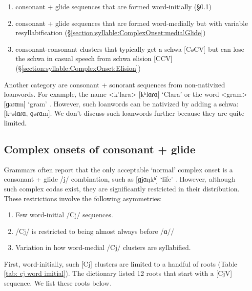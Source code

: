 	\begin{enumerate}[noitemsep,topsep=0pt]
		\item consonant + glide sequences that are formed word-initially  (\S\ref{section:syllable:ComplexOnset:glide})
		\item consonant + glide sequences that are formed word-medially but with  variable resyllabification (\S\ref{section:syllable:ComplexOnset:medialGlide})
		\item consonant-consonant clusters that typically get a schwa [CəCV] but can lose the schwa in casual speech from schwa elision [CCV] (\S\ref{section:syllable:ComplexOnset:Elision})
	\end{enumerate}
	
	Another category are  consonant + sonorant sequences from non-nativized loanwords. For example, the name <k'lara> [kʰlɑɾɑ] `Clara'  or the word <gram> [ɡəɾɑm] `gram' . However, such loanwords can be nativized by adding a schwa: [kʰəlɑɾɑ, ɡəɾɑm]. We don't discuss such loanwords further because they are quite limited. 
	
	
	\subsection{Complex onsets of consonant + glide}\label{section:syllable:ComplexOnset:glide}
	
	Grammars often report that the only acceptable `normal' complex onset is a consonant + glide /j/ combination, such as [ɡjɑŋkʰ] `life' . However, although such complex codas exist, they are significantly restricted in their distribution. These restrictions involve the following asymmetries:
	\begin{enumerate}[noitemsep,topsep=0pt]
		\item Few word-initial /Cj/ sequences. 
		\item   /Cj/ is restricted to being almost always before /ɑ// 
		\item  Variation in how word-medial /Cj/ clusters are syllabified. 
	\end{enumerate}
	
	First, word-initially, such [Cj] clusters are limited to a handful of roots (Table \ref{tab: cj word imitial}). The \citeauthor{kouyoumdjian-1970-DictionaryArmenianEnglish} dictionary listed 12 roots that start with a [CjV] sequence. We list these roots below. 
	
